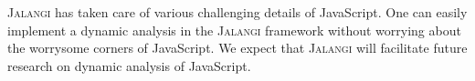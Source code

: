 \documentclass{sig-alternate}
\def\jalangi{\textsc{Jalangi}}
\begin{document}
\jalangi{} has taken care of various challenging details of JavaScript.  One
can easily implement a dynamic analysis in the \jalangi{} framework
without worrying about the worrysome corners of JavaScript.  We expect that
\jalangi{} will facilitate future research on dynamic analysis of
JavaScript. 







{\small


}
\end{document}
